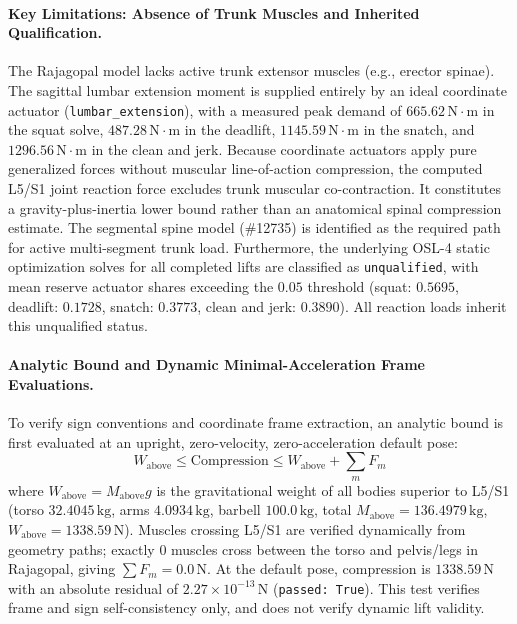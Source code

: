 \documentclass[11pt,a4paper]{article}
\begin{document}
\paragraph{Key Limitations: Absence of Trunk Muscles and Inherited Qualification.}
The Rajagopal model lacks active trunk extensor muscles (e.g., erector spinae).
The sagittal lumbar extension moment is supplied entirely by an ideal coordinate actuator
(\texttt{lumbar\_extension}), with a measured peak demand of $665.62\,\mathrm{N\cdot m}$ in the squat solve,
$487.28\,\mathrm{N\cdot m}$ in the deadlift, $1145.59\,\mathrm{N\cdot m}$ in the snatch, and
$1296.56\,\mathrm{N\cdot m}$ in the clean and jerk.
Because coordinate actuators apply pure generalized forces without muscular line-of-action compression,
the computed L5/S1 joint reaction force excludes trunk muscular co-contraction. It constitutes a
gravity-plus-inertia lower bound rather than an anatomical spinal compression estimate.
The segmental spine model (\#12735) is identified as the required path for active multi-segment trunk load.
Furthermore, the underlying OSL-4 static optimization solves for all completed lifts are classified as \texttt{unqualified},
with mean reserve actuator shares exceeding the $0.05$ threshold (squat: $0.5695$, deadlift: $0.1728$, snatch: $0.3773$, clean and jerk: $0.3890$).
All reaction loads inherit this unqualified status.

\paragraph{Analytic Bound and Dynamic Minimal-Acceleration Frame Evaluations.}
To verify sign conventions and coordinate frame extraction, an analytic bound is first evaluated at
an upright, zero-velocity, zero-acceleration default pose:
\begin{equation}
W_{\text{above}} \le \text{Compression} \le W_{\text{above}} + \sum_{m} F_m
\end{equation}
where $W_{\text{above}} = M_{\text{above}} g$ is the gravitational weight of all bodies superior to L5/S1 (torso $32.4045\,\mathrm{kg}$, arms $4.0934\,\mathrm{kg}$, barbell $100.0\,\mathrm{kg}$, total $M_{\text{above}} = 136.4979\,\mathrm{kg}$, $W_{\text{above}} = 1338.59\,\mathrm{N}$).
Muscles crossing L5/S1 are verified dynamically from geometry paths; exactly 0 muscles cross between the torso and pelvis/legs in Rajagopal, giving $\sum F_m = 0.0\,\mathrm{N}$.
At the default pose, compression is $1338.59\,\mathrm{N}$ with an absolute residual of $2.27 \times 10^{-13}\,\mathrm{N}$ (\texttt{passed: True}). This test verifies frame and sign self-consistency only, and does not verify dynamic lift validity.
\end{document}
